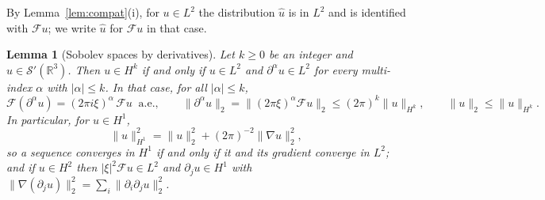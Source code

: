 \documentclass[11pt]{article}
\newtheorem{lemma}[theorem]{Lemma}
\theoremstyle{definition}
\theoremstyle{plain}
\newcommand{\R}{\mathbb R}
\begin{document}
By Lemma~\ref{lem:compat}(i), for $u\in L^2$ the distribution $\hat u$ is
in $L^2$ and is identified with $\mathcal Fu$; we write $\hat u$ for
$\mathcal Fu$ in that case.

\begin{lemma}[Sobolev spaces by derivatives]\label{lem:hk}
Let $k\ge0$ be an integer and $u\in\mathcal S'(\R^3)$.  Then $u\in H^k$ if
and only if $u\in L^2$ and $\partial^\alpha u\in L^2$ for every multi-index
$\alpha$ with $|\alpha|\le k$.  In that case, for all $|\alpha|\le k$,
\[
 \mathcal F(\partial^\alpha u)=(2\pi i\xi)^\alpha\,\mathcal Fu\ \text{ a.e.},\qquad
 \|\partial^\alpha u\|_2=\|(2\pi\xi)^\alpha\mathcal Fu\|_2\le(2\pi)^k\|u\|_{H^k},
 \qquad \|u\|_2\le\|u\|_{H^k}.
\]
In particular, for $u\in H^1$,
\begin{equation}\label{eq:h1-norm}
 \|u\|_{H^1}^2=\|u\|_2^2+(2\pi)^{-2}\|\nabla u\|_2^2 ,
\end{equation}
so a sequence converges in $H^1$ if and only if it and its gradient
converge in $L^2$; and if $u\in H^2$ then $|\xi|^2\mathcal Fu\in L^2$ and
$\partial_ju\in H^1$ with $\|\nabla(\partial_ju)\|_2^2=\sum_i\|\partial_i\partial_ju\|_2^2$.
\end{lemma}
\end{document}
